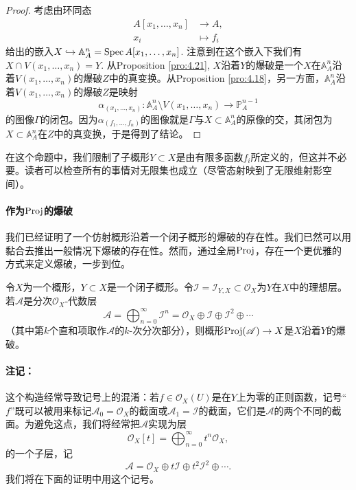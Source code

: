 \begin{proof}
	考虑由环同态
	\[
		\begin{aligned}
			A\left[x_1,\dots,x_n\right] & \longrightarrow A,\\
			x_i &\longmapsto f_i
		\end{aligned}
	\]
	给出的嵌入$X\hookrightarrow \mathbb A_A^n=\operatorname{Spec} A[x_1,\dots,x_n]$.
	注意到在这个嵌入下我们有$X\cap V(x_1,\dots,x_n)=Y$. 从Proposition \ref{pro:4.21}, $X$沿着$Y$的爆破是一个$X$在$\mathbb A_A^n$沿着$V(x_1,\dots,x_n)$的爆破$Z$中的真变换。从Proposition \ref{pro:4.18}，另一方面，$\mathbb A_A^n$沿着$V(x_1,\dots,x_n)$的爆破$Z$是映射
	\[
		\alpha_{(x_1,\dots,x_n)}:\mathbb A_A^n\setminus V(x_1,\dots,x_n)\longrightarrow \mathbb P_A^{n-1}
	\]
	的图像$\Gamma$的闭包。因为$\alpha_{(f_1,\dots,f_n)}$的图像就是$\Gamma$与$X\subset \mathbb A_A^n$的原像的交，其闭包为$X\subset \mathbb A_A^n$在$Z$中的真变换，于是得到了结论。
\end{proof}

在这个命题中，我们限制了子概形$Y\subset X$是由有限多函数$f_i$所定义的，但这并不必要。读者可以检查所有的事情对无限集也成立（尽管态射映到了无限维射影空间）。


\paragraph*{作为$\operatorname{Proj}$的爆破} 我们已经证明了一个仿射概形沿着一个闭子概形的爆破的存在性。我们已然可以用黏合去推出一般情况下爆破的存在性。然而，通过全局$\operatorname{Proj}$，存在一个更优雅的方式来定义爆破，一步到位。

\begin{thm}\label{thm:4.23}
	令$X$为一个概形，$Y\subset X$是一个闭子概形。令$\mathscr I=\mathscr I_{Y,X}\subset \mathscr O_X$为$Y$在$X$中的理想层。若$\mathscr A$是分次$\mathscr O_X$-代数层
	\[
	\mathscr A=\bigoplus_{n=0}^\infty \mathscr I^n=\mathscr O_X\oplus \mathscr I\oplus \mathscr I^2\oplus \cdots
	\]
	（其中第$k$个直和项取作$\mathscr A$的$k$-次分次部分），则概形$\operatorname{Proj}(\mathscr A)\to X$是$X$沿着$Y$的爆破。
\end{thm}

\paragraph*{注记：}这个构造经常导致记号上的混淆：若$f\in \mathscr O_X(U)$是在$Y$上为零的正则函数，记号``$f$''既可以被用来标记$\mathscr A_0=\mathscr O_X$的截面或$\mathscr A_1=\mathscr I$的截面，它们是$\mathscr A$的两个不同的截面。为避免这点，我们将经常把$\mathscr A$实现为层
\[
	\mathscr O_X[t]=\bigoplus_{n=0}^\infty t^n\mathscr O_X,
\]
的一个子层，记
\[
	\mathscr A=\mathscr O_X\oplus t\mathscr I\oplus t^2\mathscr I^2\oplus \cdots.
\]
我们将在下面的证明中用这个记号。

